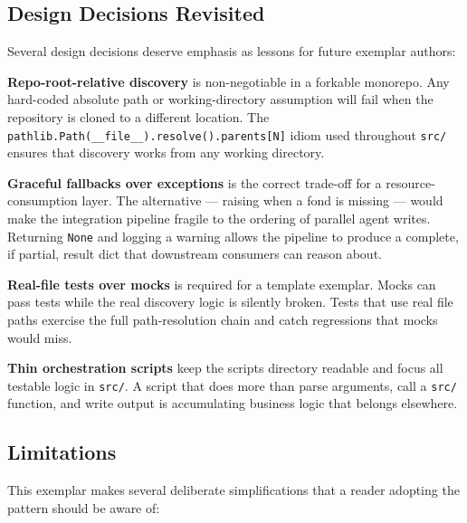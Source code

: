 \documentclass[
]{article}
\begin{document}
\subsection{Design Decisions
Revisited}\label{design-decisions-revisited}

Several design decisions deserve emphasis as lessons for future exemplar
authors:

\textbf{Repo-root-relative discovery} is non-negotiable in a forkable
monorepo. Any hard-coded absolute path or working-directory assumption
will fail when the repository is cloned to a different location. The
\texttt{pathlib.Path(\_\_file\_\_).resolve().parents{[}N{]}} idiom used
throughout \texttt{src/} ensures that discovery works from any working
directory.

\textbf{Graceful fallbacks over exceptions} is the correct trade-off for
a resource-consumption layer. The alternative --- raising
 when a fond is missing --- would make the
integration pipeline fragile to the ordering of parallel agent writes.
Returning \texttt{None} and logging a warning allows the pipeline to
produce a complete, if partial, result dict that downstream consumers
can reason about.

\textbf{Real-file tests over mocks} is required for a template exemplar.
Mocks can pass tests while the real discovery logic is silently broken.
Tests that use real file paths exercise the full path-resolution chain
and catch regressions that mocks would miss.

\textbf{Thin orchestration scripts} keep the scripts directory readable
and focus all testable logic in \texttt{src/}. A script that does more
than parse arguments, call a \texttt{src/} function, and write output is
accumulating business logic that belongs elsewhere.

\subsection{Limitations}\label{limitations}

This exemplar makes several deliberate simplifications that a reader
adopting the pattern should be aware of:
\end{document}
